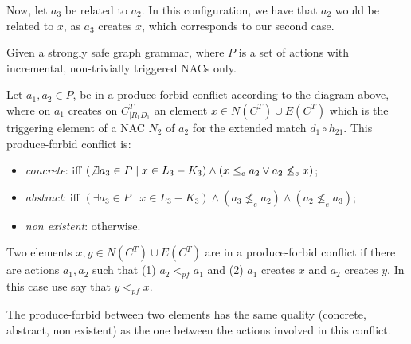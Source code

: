 \begin{description}[style=nextline,leftmargin=*]

Now, let $a_3$ be related to $a_2$. In this configuration, we have that $a_2$ would be related to $x$, as $a_3$ creates $x$, which corresponds to our second case.
\end{description}

\begin{definition} Given \doublyTypedGraphGrammarCore{} a strongly safe graph grammar, where $P$ is a set of actions with incremental, non-trivially triggered NACs only.

\hfill

  Let $a_1,a_2 \in P$, be in a produce-forbid conflict according to the diagram above, where on $a_1$ creates on $C^T_{|R_1D_1}$ an element $x \in N(C^T) \cup E(C^T)$ which is the triggering element of a NAC $N_2$ of $a_2$ for the extended match $d_1 \circ h_{21}$. This produce-forbid conflict is:

\begin{itemize}
  \item \emph{concrete}: iff $(\not\exists a_3 \in P \mid x \in L_3 - K_3) \land (x \leq_e a_2 \lor a_2 \not\leq_e x)$; %
  \item \emph{abstract}: iff $(\exists a_3 \in P \mid x \in L_3 - K_3) \land (a_3 \not\leq_e a_2) \land (a_2 \not\leq_e a_3)$;
  \item \emph{non existent}: otherwise.
\end{itemize}

  Two elements $x, y \in N(C^T) \cup E(C^T)$ are in a produce-forbid conflict if there are actions $a_1,a_2$ such that (1) $a_2 <_{pf} a_1$ and (2) $a_1$ creates $x$ and $a_2$ creates $y$. In this case use say that $y <_{pf} x$.

  The produce-forbid between two elements has the same quality (concrete, abstract, non existent) as the one between the actions involved in this conflict.
\end{definition}

